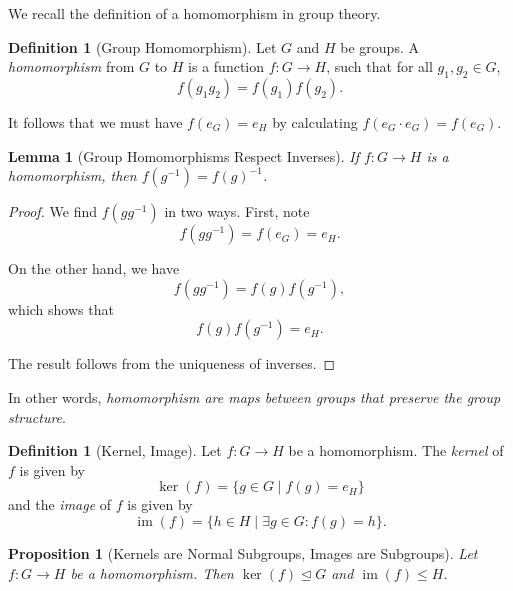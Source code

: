 \documentclass{article}
\newtheorem{lemma}[theorem]{Lemma}
\newtheorem{proposition}[theorem]{Proposition}
\theoremstyle{definition}
\newtheorem{definition}[theorem]{Definition}
\theoremstyle{remark}
\newcommand{\pqty}[1]{\left(#1\right)}
\newcommand{\set}[2]{\{#1\mid #2\}}
\newcommand{\functiondomain}[3]{#1:#2\to #3}
\newcommand{\functionmap}[3]{#1:#2\to #3}
\newcommand{\inverse}{^{-1}}
\newcommand{\normalsub}{\trianglelefteq}
\newcommand{\subgroup}{\leq}
\newcommand{\img}{\operatorname{im}}
\begin{document}
We recall the definition of a homomorphism in group theory.

\begin{definition}[Group Homomorphism]
    \label{def:group-homomorphism}%
    Let \(G\) and \(H\) be groups. A \emph{homomorphism} from \(G\) to \(H\) is a function \(\functiondomain{f}{G}{H}\), such that for all \(g_1, g_2 \in G\),
    \[
        f\pqty{g_1 g_2} = f\pqty{g_1} f\pqty{g_2}.
    \]
\end{definition}

It follows that we must have \(f\pqty{e_G} = e_H\) by calculating \(f\pqty{e_G \cdot e_G} = f\pqty{e_G}\).

\begin{lemma}[Group Homomorphisms Respect Inverses]
    \label{lem:group-homomorphisms-inverses}%
    If \(\functiondomain{f}{G}{H}\) is a homomorphism, then \(f\pqty{g\inverse} = f\pqty{g}\inverse\).
\end{lemma}

\begin{proof}
    We find \(f\pqty{g g\inverse}\) in two ways. First, note
    \[
        f\pqty{g g\inverse} = f\pqty{e_G} = e_H.
    \]

    On the other hand, we have
    \[
        f\pqty{g g\inverse} = f\pqty{g} f\pqty{g \inverse},
    \]
    which shows that
    \[
        f \pqty{g} f\pqty{g \inverse} = e_H.
    \]

    The result follows from the uniqueness of inverses.
\end{proof}

In other words, \emph{homomorphism are maps between groups that preserve the group structure}.

\begin{definition}[Kernel, Image]
    \label{def:group-homomorphism-kernel-image}%
    Let \(\functionmap{f}{G}{H}\) be a homomorphism. The \emph{kernel} of \(f\) is given by
    \[
        \ker \pqty{f} = \set{g \in G}{f\pqty{g} = e_H}
    \]
    and the \emph{image} of \(f\) is given by
    \[
        \img \pqty{f} = \set{h \in H}{\exists g \in G: f\pqty{g} = h}.
    \]
\end{definition}

\begin{proposition}[Kernels are Normal Subgroups, Images are Subgroups]
    \label{prop:kernel-normal-subgroup-image-subgroup}%
    Let \(\functiondomain{f}{G}{H}\) be a homomorphism. Then \(\ker\pqty{f} \normalsub G\) and \(\img\pqty{f} \subgroup H\).
\end{proposition}
\end{document}
